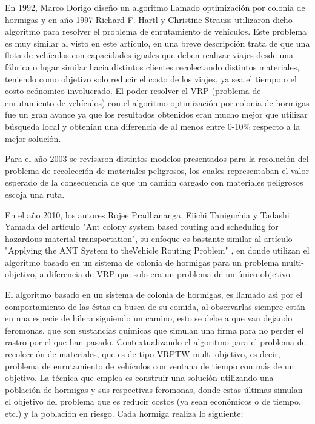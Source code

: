 \documentclass[conference]{IEEEtran}
\begin{document}
En 1992\cite{b5}, Marco Dorigo dise\~no un algoritmo llamado optimizaci\'on por colonia de hormigas y en a\'no 1997 Richard F. Hartl y Christine Strauss utilizaron dicho algoritmo para resolver el problema de enrutamiento de veh\'iculos. Este problema es muy similar al visto en este art\'iculo, en una breve descripci\'on trata de que una flota de veh\'iculos con capacidades iguales que deben realizar viajes desde una f\'abrica o lugar similar hacia distintos clientes recolectando distintos materiales, teniendo como objetivo solo reducir el costo de los viajes, ya sea el tiempo o el costo ec\'onomico involucrado. El poder resolver el VRP (problema de enrutamiento de veh\'iculos) con el algoritmo optimizaci\'on por colonia de hormigas fue un gran avance ya que los resultados obtenidos eran mucho mejor que utilizar b\'usqueda local y obten\'ian una diferencia de al menos entre 0-10\% respecto a la mejor soluci\'on. 

Para el a\~no 2003 \cite{b6} se revisaron distintos modelos presentados para la resoluci\'on del problema de recolecci\'on de materiales peligrosos, los cuales representaban el valor esperado de la consecuencia de que un cami\'on cargado con materiales peligrosos escoja una ruta.

En el a\~no 2010, los autores Rojee  Pradhananga,  Eiichi  Taniguchia y Tadashi  Yamada del art\'iculo \cite{b1} "Ant colony system based routing and scheduling for hazardous material transportation", su enfoque es bastante similar al art\'iculo "Applying  the  ANT  System  to  theVehicle Routing Problem" \cite{b5}, en donde utilizan el algoritmo basado en un sistema de colonia de hormigas para un problema multi-objetivo, a diferencia de VRP que solo era un problema de un \'unico objetivo. 

El algoritmo basado en un sistema de colonia de hormigas, es llamado asi por el comportamiento de las éstas en busca de su comida, al observarlas siempre están en una especie de hilera siguiendo un camino, esto se debe a que van dejando feromonas, que son sustancias qu\'imicas que simulan una firma para no perder el rastro por el que han pasado. Contextualizando el algoritmo para el problema de recolecci\'on de materiales, que es de tipo VRPTW multi-objetivo, es decir, problema de enrutamiento de veh\'iculos con ventana de tiempo con m\'as de un objetivo. La t\'ecnica que emplea es construir una soluci\'on utilizando una poblaci\'on de hormigas y sus respectivas feromonas, donde estas \'ultimas simulan el objetivo del problema que es reducir costos (ya sean econ\'omicos o de tiempo, etc.) y la poblaci\'on en riesgo. Cada hormiga realiza lo siguiente:
\end{document}
